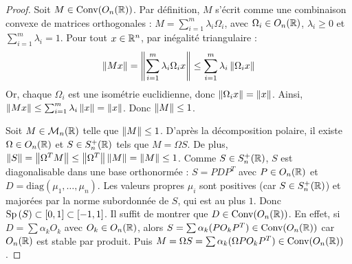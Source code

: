 \lvspace \avspace {}
\begin{proof}

    Soit $M \in \text{Conv}(O_n(\mathbb{R}))$. Par définition, $M$ s'écrit comme une combinaison convexe de matrices orthogonales :
    $M = \sum_{i=1}^m \lambda_i \Omega_i$, avec $\Omega_i \in O_n(\mathbb{R})$, $\lambda_i \ge 0$ et $\sum_{i=1}^m \lambda_i = 1$.
    Pour tout $x \in \mathbb{R}^n$, par inégalité triangulaire :
    \[ \left\|Mx\right\| = \left\|\sum_{i=1}^m \lambda_i \Omega_i x\right\| \le \sum_{i=1}^m \lambda_i \left\|\Omega_i x\right\| \]
    Or, chaque $\Omega_i$ est une isométrie euclidienne, donc $\left\|\Omega_i x\right\| = \left\|x\right\|$.
    Ainsi, $\left\|Mx\right\| \le \sum_{i=1}^m \lambda_i \left\|x\right\| = \left\|x\right\|$. Donc $\left\|M\right\| \le 1$.


    Soit $M \in \mathcal{M}_n(\mathbb{R})$ telle que $\left\|M\right\| \le 1$. D'après la décomposition polaire, il existe $\Omega \in O_n(\mathbb{R})$ et $S \in S_n^+(\mathbb{R})$ tels que $M = \Omega S$.
    De plus, $\left\|S\right\| = \left\|\Omega^T M\right\| \le \left\|\Omega^T\right\| \left\|M\right\| = \left\|M\right\| \le 1$.
    Comme $S \in S_n^+(\mathbb{R})$, $S$ est diagonalisable dans une base orthonormée : $S = P D P^T$ avec $P \in O_n(\mathbb{R})$ et $D = \text{diag}(\mu_1, \dots, \mu_n)$.
    Les valeurs propres $\mu_i$ sont positives (car $S \in S_n^+(\mathbb{R})$) et majorées par la norme subordonnée de $S$, qui est au plus $1$.
    Donc $\operatorname{Sp} \,(S) \subset [0, 1] \subset [-1, 1]$.
    Il suffit de montrer que $D \in \text{Conv}(O_n(\mathbb{R}))$. En effet, si $D = \sum \alpha_k O_k$ avec $O_k \in O_n(\mathbb{R})$, alors $S = \sum \alpha_k (P O_k P^T) \in \text{Conv}(O_n(\mathbb{R}))$ car $O_n(\mathbb{R})$ est stable par produit.
    Puis $M = \Omega S = \sum \alpha_k (\Omega P O_k P^T) \in \text{Conv}(O_n(\mathbb{R}))$.


\end{proof}
